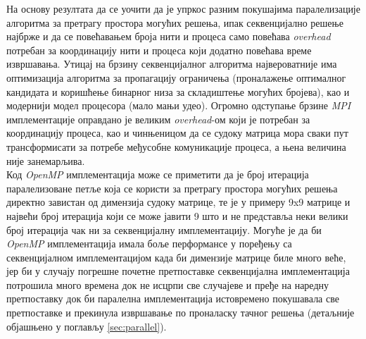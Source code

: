 На основу резултата да се уочити да је упркос разним покушајима паралелизације алгоритма за претрагу простора могућих решења, ипак секвенцијално решење најбрже и да се повећавањем броја нити и процеса само повећава \textit{overhead} потребан за координацију нити и процеса који додатно повећава време извршавања. Утицај на брзину секвенцијалног алгоритма највероватније има оптимизација алгоритма за пропагацију ограничења (проналажење оптималног кандидата и коришћење бинарног низа за складиштење могућих бројева), као и модернији модел процесора (мало мањи удео). Огромно одступање брзине \textit{MPI} имплементације оправдано је великим \textit{overhead}-ом који је потребан за координацију процеса, као и чинњеницом да се судоку матрица мора сваки пут трансформисати за потребе међусобне комуникације процеса, а њена величина није занемарљива.\\

Код \textit{OpenMP} имплементација може се приметити да је број итерација паралелизоване петље која се користи за претрагу простора могућих решења директно завистан од димензија судоку матрице, те је у примеру 9x9 матрице и највећи број итерација који се може јавити 9 што и не представља неки велики број итерација чак ни за секвенцијалну имплементацију. Могуће је да би \textit{OpenMP} имплементација имала боље перформансе у поређењу са секвенцијалном имплементацијом када би димензије матрице биле много веће, јер би у случају погрешне почетне претпоставке секвенцијална имплементација потрошила много времена док не исцрпи све случајеве и пређе на наредну претпоставку док би паралелна имплементација истовремено покушавала све претпоставке и прекинула извршавање по проналаску тачног решења  (детаљније објашњено у поглављу \ref{sec:parallel}).
